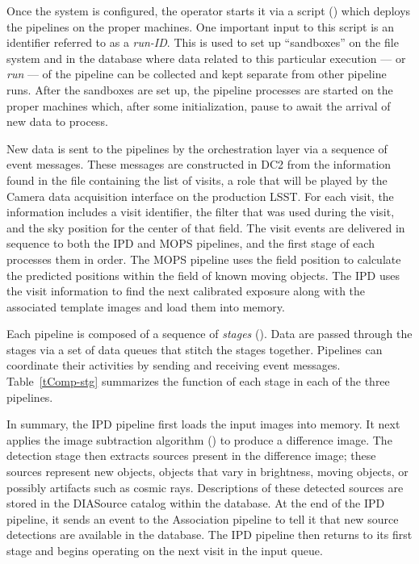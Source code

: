 Once the system is configured, the operator starts it via a script 
() which deploys the pipelines on the proper
machines.  One important input to this script is an identifier
referred to as a \textit{run-ID}.  This is used to set up ``sandboxes''
on the file system and in the database where data related to this
particular execution --- or \textit{run} --- of the pipeline can be collected
and kept separate from other pipeline runs.  After the sandboxes are
set up, the pipeline processes are started on the proper machines which,
after some initialization, pause to await the arrival of new data to
process.  

New data is sent to the pipelines by the orchestration layer via a
sequence of event messages.  These messages are constructed in DC2 from
the information found in the file containing the list of visits, a
role that will be played by the Camera data acquisition interface on
the production LSST.  For
each visit, the information includes a visit identifier, the filter
that was used during the visit, and the sky position for the center of
that field.  The visit events are delivered in sequence to both the
IPD and MOPS pipelines, and the first stage of each processes them in
order.  The MOPS pipeline uses the field position to calculate the
predicted positions within the field of known moving objects.  The IPD
uses the visit information to find the next calibrated exposure along
with the associated template images and load them into memory.  

Each pipeline is composed of a sequence of \textit{stages}
().  Data are passed through the stages via a set of 
data queues that stitch the stages together.  Pipelines can coordinate
their activities by sending and receiving event messages.
Table~\ref{tComp-stg} summarizes the function of each stage in each of the
three pipelines.  

In summary, the IPD pipeline first loads the input images into memory.
It next applies the image subtraction algorithm () to
produce a difference image.  The detection stage then extracts sources
present in the difference image; these sources represent new objects,
objects that vary in brightness, moving objects, or possibly artifacts
such as cosmic rays.  Descriptions of
these detected sources are stored in the DIASource catalog within the
database.   At the end of the IPD pipeline, it sends an event to the
Association pipeline to tell it that new source detections are
available in the database.  The IPD pipeline then returns to its first
stage and begins operating on the next visit in the input queue.

